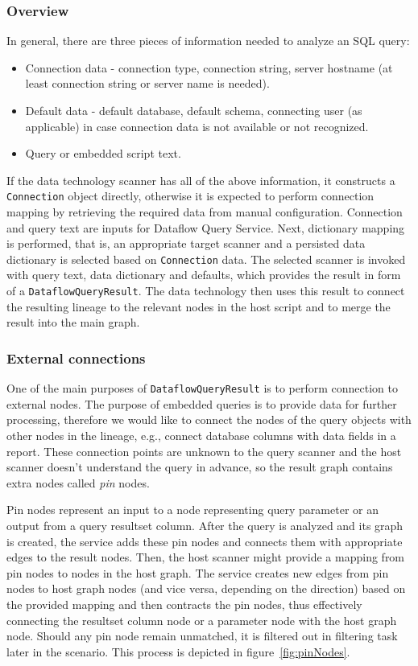 \subsubsection{Overview}
In general, there are three pieces of information needed to analyze an SQL query:
\begin{itemize}
    \item Connection data - connection type, connection string, server hostname (at least connection string or server name is needed).
    \item Default data - default database, default schema, connecting user (as applicable) in case connection data is not available or not recognized.
    \item Query or embedded script text.
\end{itemize}
If the data technology scanner has all of the above information, it constructs a \texttt{Connection} object directly, otherwise it is expected to perform connection mapping by retrieving the required data from manual configuration. Connection and query text are inputs for Dataflow Query Service. Next, dictionary mapping is performed, that is, an appropriate target scanner and a persisted data dictionary is selected based on \texttt{Connection} data. The selected scanner is invoked with query text, data dictionary and defaults, which provides the result in form of a \texttt{DataflowQueryResult}. The data technology then uses this result to connect the resulting lineage to the relevant nodes in the host script and to merge the result into the main graph.

\subsubsection{External connections}
One of the main purposes of \texttt{DataflowQueryResult} is to perform connection to external nodes. The purpose of embedded queries is to provide data for further processing, therefore we would like to connect the nodes of the query objects with other nodes in the lineage, e.g., connect database columns with data fields in a report. These connection points are unknown to the query scanner and the host scanner doesn't understand the query in advance, so the result graph contains extra nodes called \textit{pin} nodes.
\par
Pin nodes represent an input to a node representing query parameter or an output from a query resultset column. After the query is analyzed and its graph is created, the service adds these pin nodes and connects them with appropriate edges to the result nodes. Then, the host scanner might provide a mapping from pin nodes to nodes in the host graph. The service creates new edges from pin nodes to host graph nodes (and vice versa, depending on the direction) based on the provided mapping and then contracts the pin nodes, thus effectively connecting the resultset column node or a parameter node with the host graph node. Should any pin node remain unmatched, it is filtered out in filtering task later in the scenario. This process is depicted in figure~\ref{fig:pinNodes}.

